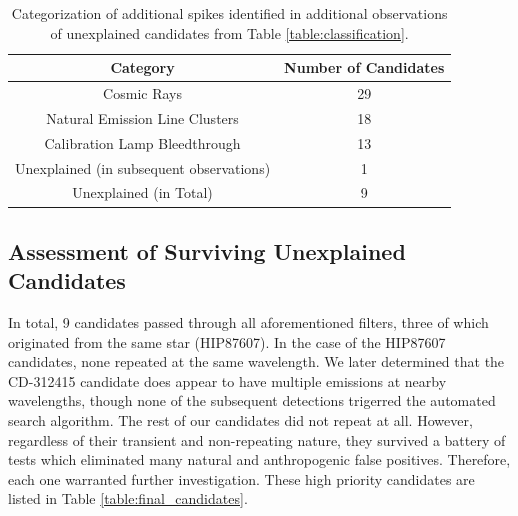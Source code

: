 \documentclass[linenumbers]{aastex631}
\begin{document}
\begin{table}
\begin{center}
\begin{tabular}{|c|c|} 
 \hline
 Category & Number of Candidates \\ 
 \hline
 Cosmic Rays & 29 \\ 
 Natural Emission Line Clusters & 18 \\ 
 Calibration Lamp Bleedthrough &  13 \\ 
 Unexplained (in subsequent observations) & 1 \\
 Unexplained (in Total) & 9 \\
 \hline
 \end{tabular}
\end{center}

\caption{Categorization of additional spikes identified in additional observations of unexplained candidates from Table \ref{table:classification}.}
\label{table:followup}
\end{table}

\subsection{Assessment of Surviving Unexplained Candidates}
\label{s:unexplained}
In total, 9 candidates passed through all aforementioned filters, three of which originated from the same star (HIP87607). In the case of the HIP87607 candidates, none repeated at the same wavelength. We later determined that the CD-312415 candidate does appear to have multiple emissions at nearby wavelengths, though none of the subsequent detections trigerred the automated search algorithm. The rest of our candidates did not repeat at all. However, regardless of their transient and non-repeating nature, they survived a battery of tests which eliminated many natural and anthropogenic false positives. Therefore, each one warranted further investigation. These high priority candidates are listed in Table \ref{table:final_candidates}.
\end{document}
